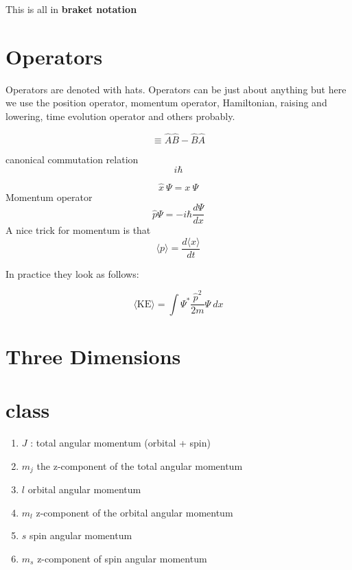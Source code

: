 This is all in \textbf{braket notation}

\section{Operators}
Operators are denoted with hats. Operators can be just about anything but here we use the position operator, momentum operator, Hamiltonian, raising and lowering, time evolution operator and others probably.

\begin{equation}
  [\hat{A},\hat{B}]\equiv \hat{A}\hat{B}-\hat{B}\hat{A}
\end{equation}

canonical commutation relation
\begin{equation}
  [x,\hat{p}]i\hbar 
\end{equation}

\begin{equation}
  \label{position-operator}
  \hat{x}~\Psi = x~\Psi
\end{equation}
Momentum operator
\begin{equation}
  \label{momentum-operator}
  \hat{p}\Psi = -i\hbar \frac{d\Psi}{dx}
\end{equation}
A nice trick for momentum is that
\begin{equation}
  \langle p\rangle = \frac{d\langle x\rangle}{dt}
\end{equation}





In practice they look as follows:

\begin{equation}
  \langle\text{KE}\rangle = \int\Psi^{*}\frac{\hat{p}^2}{2m}\Psi~dx
\end{equation}

\section{Three Dimensions}

\section{class}
\begin{enumerate}
  \item $ J $ : total angular momentum (orbital + spin)
  \item $ m_{j} $ the z-component of the total angular momentum
  \item $ l $ orbital angular momentum
  \item $ m_{l} $ z-component of the orbital angular momentum
  \item $ s $ spin angular momentum
  \item $ m_{s} $ z-component of spin angular momentum
\end{enumerate}




